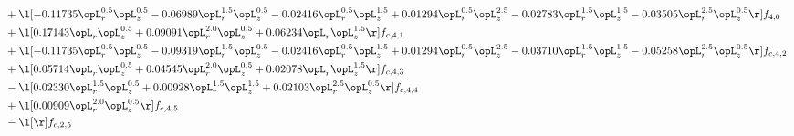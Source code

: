 \begin{alignat}{2}
& + \l[  -0.11735 \opL_r^{0.5} \opL_z^{0.5}   -0.06989 \opL_r^{1.5} \opL_z^{0.5}   -0.02416 \opL_r^{0.5} \opL_z^{1.5} +  0.01294 \opL_r^{0.5} \opL_z^{2.5}   -0.02783 \opL_r^{1.5} \opL_z^{1.5}   -0.03505 \opL_r^{2.5} \opL_z^{0.5}  \r] f_{4,0} \nonumber \\ 
& + \l[  0.17143 \opL_r \opL_z^{0.5} +  0.09091 \opL_r^{2.0} \opL_z^{0.5} +  0.06234 \opL_r \opL_z^{1.5}  \r] f_{c,4,1} \nonumber \\ 
& + \l[  -0.11735 \opL_r^{0.5} \opL_z^{0.5}   -0.09319 \opL_r^{1.5} \opL_z^{0.5}   -0.02416 \opL_r^{0.5} \opL_z^{1.5} +  0.01294 \opL_r^{0.5} \opL_z^{2.5}   -0.03710 \opL_r^{1.5} \opL_z^{1.5}   -0.05258 \opL_r^{2.5} \opL_z^{0.5}  \r] f_{c,4,2} \nonumber \\ 
& + \l[  0.05714 \opL_r \opL_z^{0.5} +  0.04545 \opL_r^{2.0} \opL_z^{0.5} +  0.02078 \opL_r \opL_z^{1.5}  \r] f_{c,4,3} \nonumber \\ 
& - \l[  0.02330 \opL_r^{1.5} \opL_z^{0.5} +  0.00928 \opL_r^{1.5} \opL_z^{1.5} +  0.02103 \opL_r^{2.5} \opL_z^{0.5}  \r] f_{c,4,4} \nonumber \\ 
& + \l[  0.00909 \opL_r^{2.0} \opL_z^{0.5}  \r] f_{c,4,5} \nonumber \\ 
& - \l[  \r] f_{c,2,5} \nonumber \\ 
\end{alignat} 


